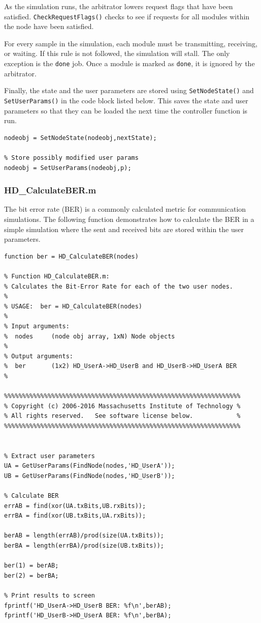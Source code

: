As the simulation runs, the arbitrator lowers request flags that
have been satisfied.  \verb+CheckRequestFlags()+ checks to see if
requests for all modules within the node have been satisfied.

For every sample in the simulation, each module must be
transmitting, receiving, or waiting.  If this rule is not followed,
the simulation will stall.  The only exception is the \verb+done+
job. Once a module is marked as \verb+done+, it is ignored by the
arbitrator.

Finally, the state and the user parameters are stored using
\verb+SetNodeState()+ and \verb+SetUserParams()+ in the code block
listed below.  This saves the state and user parameters so that they
can be loaded the next time the controller function is run.

\begin{lstlisting}[name=hdState]
% Set next state
nodeobj = SetNodeState(nodeobj,nextState);

% Store possibly modified user params
nodeobj = SetUserParams(nodeobj,p);
\end{lstlisting}


\subsubsection{HD\_CalculateBER.m}

The bit error rate (BER) is a commonly calculated metric for
communication simulations.  The following function demonstrates how
to calculate the BER in a simple simulation where the sent and
received bits are stored within the user parameters.

\begin{lstlisting}[name=ber]
function ber = HD_CalculateBER(nodes)

% Function HD_CalculateBER.m:
% Calculates the Bit-Error Rate for each of the two user nodes.
%
% USAGE:  ber = HD_CalculateBER(nodes)
%
% Input arguments:
%  nodes     (node obj array, 1xN) Node objects
%
% Output arguments:
%  ber       (1x2) HD_UserA->HD_UserB and HD_UserB->HD_UserA BER
%

%%%%%%%%%%%%%%%%%%%%%%%%%%%%%%%%%%%%%%%%%%%%%%%%%%%%%%%%%%%%%%%%%
% Copyright (c) 2006-2016 Massachusetts Institute of Technology %
% All rights reserved.   See software license below.            %
%%%%%%%%%%%%%%%%%%%%%%%%%%%%%%%%%%%%%%%%%%%%%%%%%%%%%%%%%%%%%%%%%


% Extract user parameters
UA = GetUserParams(FindNode(nodes,'HD_UserA'));
UB = GetUserParams(FindNode(nodes,'HD_UserB'));

% Calculate BER
errAB = find(xor(UA.txBits,UB.rxBits));
errBA = find(xor(UB.txBits,UA.rxBits));

berAB = length(errAB)/prod(size(UA.txBits));
berBA = length(errBA)/prod(size(UB.txBits));

ber(1) = berAB;
ber(2) = berBA;

% Print results to screen
fprintf('HD_UserA->HD_UserB BER: %f\n',berAB);
fprintf('HD_UserB->HD_UserA BER: %f\n',berBA);
\end{lstlisting}

